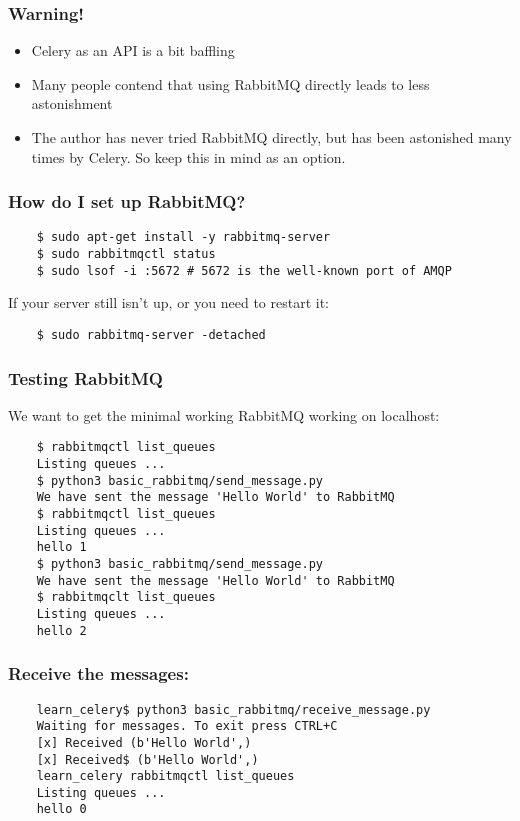\documentclass[9pt]{beamer}
\begin{document}
\begin{frame}[fragile]
  \frametitle{Warning!}
  \begin{itemize}
  \item Celery as an API is a bit baffling
    \pause
  \item Many people contend that using RabbitMQ directly leads to less astonishment
    \pause
  \item The author has never tried RabbitMQ directly, but has been astonished many times by Celery. So keep this in mind as an option.
  \end{itemize}
\end{frame}

\begin{frame}[fragile]
  \frametitle{How do I set up RabbitMQ?}
  \begin{verbatim}
    $ sudo apt-get install -y rabbitmq-server
    $ sudo rabbitmqctl status
    $ sudo lsof -i :5672 # 5672 is the well-known port of AMQP
  \end{verbatim}
  If your server still isn't up, or you need to restart it:
  \begin{verbatim}
    $ sudo rabbitmq-server -detached 
  \end{verbatim}
\end{frame}

\begin{frame}[fragile]
  \frametitle{Testing RabbitMQ}
  We want to get the minimal working RabbitMQ working on localhost:
  \begin{verbatim}
    $ rabbitmqctl list_queues
    Listing queues ...
    $ python3 basic_rabbitmq/send_message.py
    We have sent the message 'Hello World' to RabbitMQ
    $ rabbitmqctl list_queues
    Listing queues ...
    hello 1
    $ python3 basic_rabbitmq/send_message.py
    We have sent the message 'Hello World' to RabbitMQ
    $ rabbitmqclt list_queues
    Listing queues ...
    hello 2
  \end{verbatim}
\end{frame}

\begin{frame}[fragile]
  \frametitle{Receive the messages:}
  \begin{verbatim}
    learn_celery$ python3 basic_rabbitmq/receive_message.py
    Waiting for messages. To exit press CTRL+C
    [x] Received (b'Hello World',)
    [x] Received$ (b'Hello World',)
    learn_celery rabbitmqctl list_queues
    Listing queues ...
    hello 0
  \end{verbatim}
\end{frame}
\end{document}
